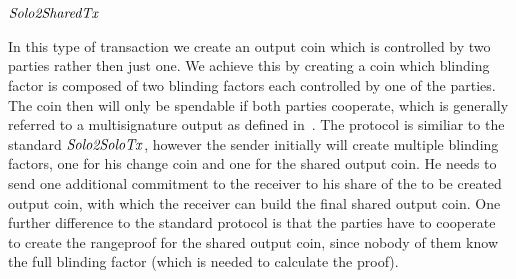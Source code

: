 \subsection{$\mathit{Solo2SharedTx}$}

In this type of transaction we create an output coin which is controlled by two parties rather then just one. We achieve this by creating a coin which blinding factor is composed of two blinding factors each controlled
by one of the parties. The coin then will only be spendable if both parties cooperate, which is generally referred to a multisignature output as defined in~\cite{bistarelli2018analysis}. The protocol is
similiar to the standard $\mathit{Solo2SoloTx}$, however the sender initially will create multiple blinding factors, one for his change coin and one for the shared output coin. He needs to send one additional commitment to the
receiver to his share of the to be created output coin, with which the receiver can build the final shared output coin. One further difference to the standard protocol is that the parties have to cooperate to create the
rangeproof for the shared output coin, since nobody of them know the full blinding factor (which is needed to calculate the proof).

